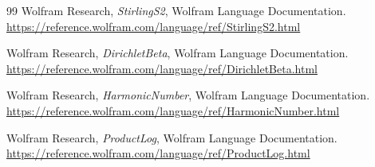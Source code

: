 \documentclass[11pt,a4paper]{article}
\numberwithin{equation}{section}
\theoremstyle{definition}
\theoremstyle{remark}
\begin{document}
\begin{thebibliography}{99}
Wolfram Research, \emph{StirlingS2}, Wolfram Language Documentation.\newline
\url{https://reference.wolfram.com/language/ref/StirlingS2.html}

Wolfram Research, \emph{DirichletBeta}, Wolfram Language Documentation.\newline
\url{https://reference.wolfram.com/language/ref/DirichletBeta.html}

Wolfram Research, \emph{HarmonicNumber}, Wolfram Language Documentation.\newline
\url{https://reference.wolfram.com/language/ref/HarmonicNumber.html}

Wolfram Research, \emph{ProductLog}, Wolfram Language Documentation.\newline
\url{https://reference.wolfram.com/language/ref/ProductLog.html}

\end{thebibliography}
\end{document}
